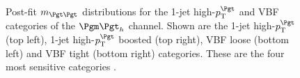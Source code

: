 \begin{figure}[tbh]

\caption[Post-fit $m_{\Pgt\Pgt}$ distributions for the 1-jet high-$\pt^{\Pgt}$ and VBF 
categories of the $\mutau$ channel.]{Post-fit $m_{\Pgt\Pgt}$ distributions for
the 1-jet high-$\pt^{\Pgt}$ and VBF categories of the $\mutau$ channel. Shown
are the 1-jet high-$\pt^{\Pgt}$ (top left), 1-jet high-$\pt^{\Pgt}$ boosted (top
right), VBF loose (bottom left) and VBF tight (bottom right) categories. These
are the four most sensitive categories \cite{HIG-13-004}.}
\label{fig:postfit1jetvbfmutau}
\end{figure}

